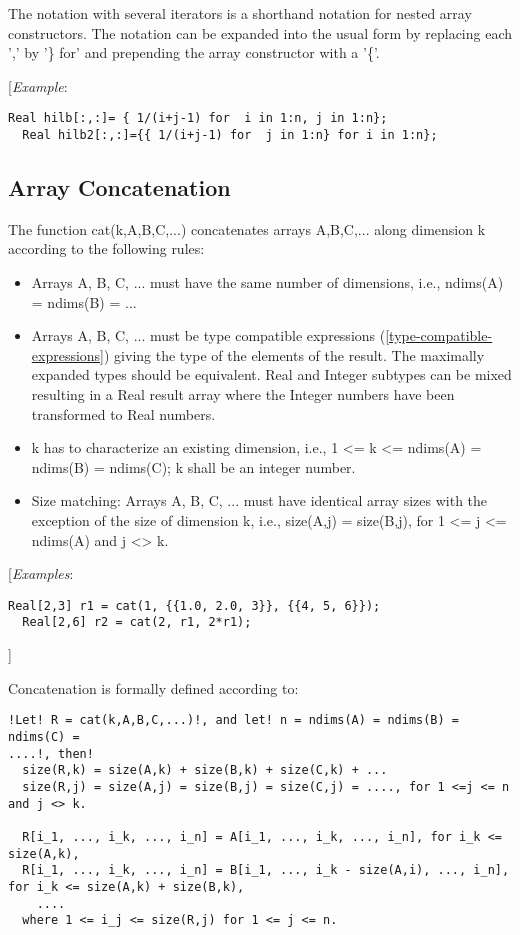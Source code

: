 The notation with several iterators is a shorthand notation for nested
array constructors. The notation can be expanded into the usual form by
replacing each ',' by '\} for' and prepending the array constructor with
a '\{'.

{[}\emph{Example}:

\begin{lstlisting}[language=modelica]
  Real hilb[:,:]= { 1/(i+j-1) for  i in 1:n, j in 1:n};
  Real hilb2[:,:]={{ 1/(i+j-1) for  j in 1:n} for i in 1:n};
\end{lstlisting}
\subsection{Array Concatenation}

The function cat(k,A,B,C,...) concatenates arrays A,B,C,... along
dimension k according to the following rules:

\begin{itemize}
\item
  Arrays A, B, C, ... must have the same number of dimensions, i.e.,
  ndims(A) = ndims(B) = ...
\item
  Arrays A, B, C, ... must be type compatible expressions (\autoref{type-compatible-expressions})
  giving the type of the elements of the result. The maximally expanded
  types should be equivalent. Real and Integer subtypes can be mixed
  resulting in a Real result array where the Integer numbers have been
  transformed to Real numbers.
\item
  k has to characterize an existing dimension, i.e., 1 \textless{}= k
  \textless{}= ndims(A) = ndims(B) = ndims(C); k shall be an integer
  number.
\item
  Size matching: Arrays A, B, C, ... must have identical array sizes
  with the exception of the size of dimension k, i.e., size(A,j) =
  size(B,j), for 1 \textless{}= j \textless{}= ndims(A) and j
  \textless{}\textgreater{} k.
\end{itemize}

{[}\emph{Examples}:

\begin{lstlisting}[language=modelica]
  Real[2,3] r1 = cat(1, {{1.0, 2.0, 3}}, {{4, 5, 6}});
  Real[2,6] r2 = cat(2, r1, 2*r1);
\end{lstlisting}
{]}

Concatenation is formally defined according to:
\begin{lstlisting}[language=modelica, escapechar=!]
!Let! R = cat(k,A,B,C,...)!, and let! n = ndims(A) = ndims(B) = ndims(C) =
....!, then!
  size(R,k) = size(A,k) + size(B,k) + size(C,k) + ...
  size(R,j) = size(A,j) = size(B,j) = size(C,j) = ...., for 1 <=j <= n and j <> k.

  R[i_1, ..., i_k, ..., i_n] = A[i_1, ..., i_k, ..., i_n], for i_k <= size(A,k),
  R[i_1, ..., i_k, ..., i_n] = B[i_1, ..., i_k - size(A,i), ..., i_n], for i_k <= size(A,k) + size(B,k),
    ....
  where 1 <= i_j <= size(R,j) for 1 <= j <= n.
\end{lstlisting}


